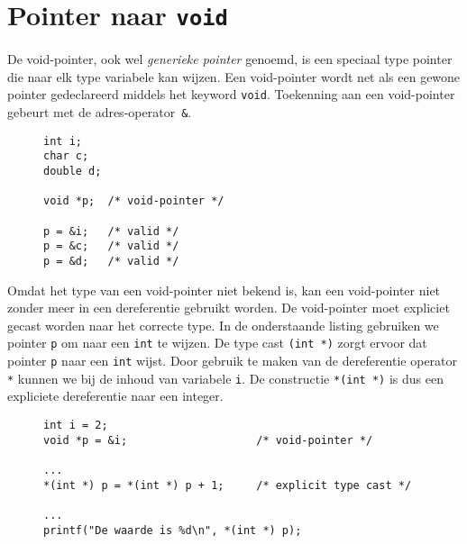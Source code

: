 \section{Pointer naar \texttt{void}}
\label{sec:pointertovoid}

De void-pointer, ook wel \textsl{generieke pointer} genoemd, is een speciaal type pointer die naar elk type variabele kan wijzen. Een void-pointer wordt net als een gewone pointer gedeclareerd middels het keyword \texttt{void}. Toekenning aan een void-pointer gebeurt met de adres-operator~\texttt{\&}.

\begin{figure}[!ht]
\begin{lstlisting}[caption=Declaratie en initialisatie van een void-pointer.]
int i;
char c;
double d;

void *p;  /* void-pointer */

p = &i;   /* valid */
p = &c;   /* valid */
p = &d;   /* valid */
\end{lstlisting}
\end{figure}

Omdat het type van een void-pointer niet bekend is, kan een void-pointer niet zonder meer in een dereferentie gebruikt worden. De void-pointer moet expliciet gecast worden naar het correcte type. In de onderstaande listing gebruiken we pointer \texttt{p} om naar een \texttt{int} te wijzen. De type cast \texttt{(int *)} zorgt ervoor dat pointer \texttt{p} naar een \texttt{int} wijst. Door gebruik te maken van de dereferentie operator \texttt{*} kunnen we bij de inhoud van variabele \texttt{i}. De constructie \texttt{*(int *)} is dus een expliciete dereferentie naar een integer.

\begin{figure}[!ht]
\begin{lstlisting}[caption={Declaratie, initialisatie en deference van een void-pointer.}]
int i = 2;
void *p = &i;                    /* void-pointer */

...
*(int *) p = *(int *) p + 1;     /* explicit type cast */

...
printf("De waarde is %d\n", *(int *) p);
\end{lstlisting}
\end{figure}


